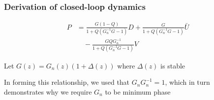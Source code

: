 \begin{frame}
    \frametitle{Derivation of closed-loop dynamics}

    \begin{align*}
        P & = \frac{G (1-Q)}{1 + Q ( G_n^{-1} G - 1)} D + \frac{G}{1 + Q ( G_n^{-1} G - 1)} \bar{U} \\
        & \quad - \frac{GQ G_n^{-1}}{1 + Q ( G_n^{-1} G - 1)} V
    \end{align*}

    Let $G(z) = G_n(z) (1 + \Delta(z))$ where $\Delta(z)$ is stable
    \pause

    \pause

    In forming this relationship, we used that $G_n G_n^{-1} = 1$, which in turn demonstrates why we require $G_n$ to be minimum phase

\end{frame}



